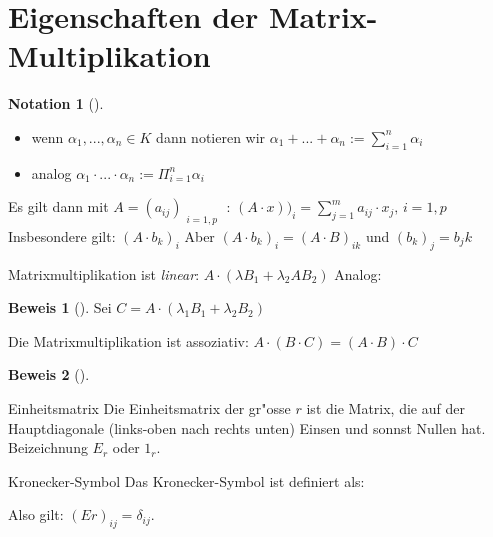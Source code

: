 \documentclass[oneside,fontsize=11pt,paper=a4,BCOR=0mm,DIV=12,automark,headsepline]{scrbook}
\theoremstyle{remark}
\theoremstyle{definition}
\newtheorem*{notation}{Notation}
\theoremstyle{definition}
\newtheorem*{prof}{Beweis}
\theoremstyle{remark}
\begin{document}
\section{Eigenschaften der Matrix-Multiplikation}
\label{sec:org8eaaee0}
\begin{notation}[]
\begin{itemize}
\item wenn \(\alpha_1,...,\alpha_n\in K\) dann notieren wir \(\alpha_1+...+\alpha_n :=
   \sum_{i=1}^{n}{\alpha_i}\)
\item analog \(\alpha_1\cdot ...\cdot\alpha_n := \Pi_{i=1}^{n}{\alpha_i}\)
\end{itemize}
\end{notation}

\begin{relation}
Es gilt dann mit \(A=(a_{ij})_{\substack{i=1,p}}\) : \((A\cdot
x))_i=\sum_{j=1}^{m}{a_{ij}\cdot x_j,\, i=1,p}\) \\

Insbesondere gilt: \((A\cdot b_k)_i\) Aber \((A\cdot b_k)_i = (A\cdot B)_{ik}\) und \((b_k)_j=b_jk\)
\end{relation}

\begin{relation}
Matrixmultiplikation ist \emph{linear}: \(A\cdot (\lambda B_1 + \lambda_2 A B_2)\)
Analog:
\end{relation}

\begin{prof}[]
Sei \(C=A\cdot (\lambda_1 B_1 + \lambda_2 B_2)\)
\end{prof}

\begin{relation}
Die Matrixmultiplikation ist assoziativ: \(A\cdot (B\cdot C)=(A\cdot B)\cdot C\)
\end{relation}

\begin{prof}[]

\end{prof}

\begin{definition}{Einheitsmatrix}{}
Die Einheitsmatrix der gr"osse \(r\) ist die Matrix, die auf der Hauptdiagonale
(links-oben nach rechts unten) Einsen und sonnst Nullen hat. Beizeichnung \(E_r\)
oder \(1_r\).
\end{definition}

\begin{definition}{Kronecker-Symbol}{}
Das Kronecker-Symbol ist definiert als: 

Also gilt: \((Er)_{ij}=\delta_{ij}\).
\end{definition}
\end{document}
